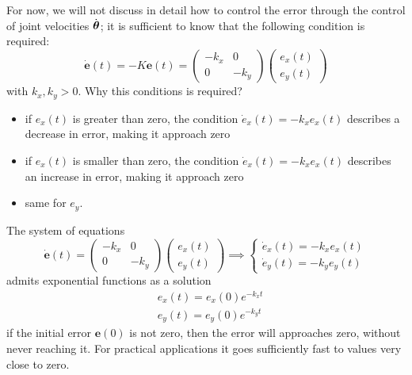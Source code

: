 \documentclass[10pt, letterpaper]{report}
\begin{document}
For now, we will not discuss in detail how to control the error through the control of joint velocities $\dot{{\boldsymbol{\theta}}}$; it is sufficient to know that the following condition is required:\begin{equation}
    \dot{\mathbf e}(t)=-K\mathbf e(t)=\begin{pmatrix}
        -k_x&0\\
        0&-k_y
    \end{pmatrix}\begin{pmatrix}
        e_x(t)\\ e_y(t)
    \end{pmatrix}
\end{equation}
with $k_x,k_y>0$.
Why this conditions is required?\begin{itemize}
    \item if $e_x(t)$ is greater than zero, the condition $\dot e_x(t)=-k_xe_x(t)$ describes a decrease in error, making it approach zero 
    \item if $e_x(t)$ is smaller than zero, the condition $\dot e_x(t)=-k_xe_x(t)$ describes an increase in error, making it approach zero 
    \item same for $e_y$.
\end{itemize}
The system of equations\begin{equation}
    \dot{\mathbf e}(t)=\begin{pmatrix}
        -k_x&0\\
        0&-k_y
    \end{pmatrix}\begin{pmatrix}
        e_x(t)\\ e_y(t)
    \end{pmatrix}\implies \begin{cases}
        \dot e_x(t)=-k_xe_x(t)\\
        \dot e_y(t)=-k_ye_y(t)
    \end{cases}
\end{equation}
admits exponential functions as a solution\begin{align}
    &e_x(t)=e_x(0)e^{-k_xt}\\
    &e_y(t)=e_y(0)e^{-k_yt}
\end{align}
if the initial error $\mathbf e(0)$ is not zero, then the error will approaches zero, without never reaching it. For practical applications it goes sufficiently
fast to values very close to zero.\bigskip
\end{document}
